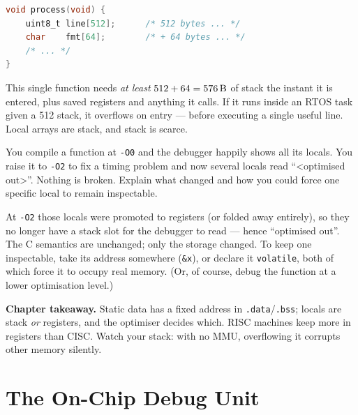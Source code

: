 \documentclass[11pt,a4paper,oneside]{book}
\newcommand{\code}[1]{\texttt{#1}}
\begin{document}
\begin{wexample}
\begin{lstlisting}[language=C]
void process(void) {
    uint8_t line[512];      /* 512 bytes ... */
    char    fmt[64];        /* + 64 bytes ... */
    /* ... */
}
\end{lstlisting}
This single function needs \emph{at least} $512 + 64 = \qty{576}{\byte}$ of
stack the instant it is entered, plus saved registers and anything it calls. If
it runs inside an RTOS task given a \qty{512}{\byte} stack, it overflows on
entry --- before executing a single useful line. Local arrays are stack, and
stack is scarce.
\end{wexample}

\begin{exercise}
You compile a function at \code{-O0} and the debugger happily shows all its
locals. You raise it to \code{-O2} to fix a timing problem and now several
locals read ``\textless optimised out\textgreater''. Nothing is broken. Explain
what changed and how you could force one specific local to remain inspectable.
\end{exercise}
\begin{solution}
At \code{-O2} those locals were promoted to registers (or folded away
entirely), so they no longer have a stack slot for the debugger to read --- hence
``optimised out''. The C semantics are unchanged; only the storage changed. To
keep one inspectable, take its address somewhere (\code{\&x}), or declare it
\code{volatile}, both of which force it to occupy real memory. (Or, of course,
debug the function at a lower optimisation level.)
\end{solution}

\begin{keyidea}
\textbf{Chapter takeaway.} Static data has a fixed address in
\code{.data}/\code{.bss}; locals are stack \emph{or} registers, and the
optimiser decides which. RISC machines keep more in registers than CISC.
Watch your stack: with no MMU, overflowing it corrupts other memory silently.
\end{keyidea}

\chapter{The On-Chip Debug Unit}
\label{ch:debug}
\end{document}
